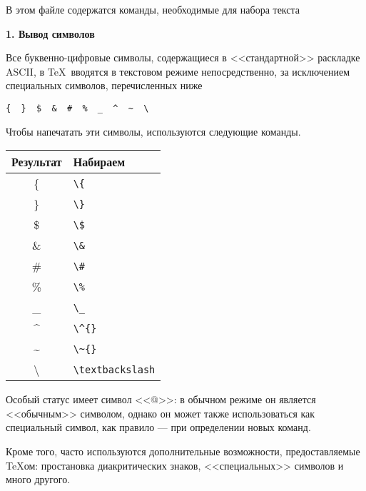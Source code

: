 \documentclass{article}
\begin{document}
\begin{center}
В этом файле содержатся команды, необходимые для набора текста
\end{center}

\textbf{1. Вывод символов}

Все буквенно-цифровые символы, содержащиеся в <<стандартной>> раскладке ASCII, в \TeX\ вводятся в текстовом режиме непосредственно, за исключением специальных символов, перечисленных ниже
\begin{center}
 \verb"{  }  $  &  #  %  _  ^  ~  \"
\end{center}

Чтобы напечатать эти символы, используются следующие команды.

\begin{center}
\begin{tabular}{|c|l|}
\hline
\textbf{Результат} & \textbf{Набираем}     \\ \hline
\{                 & \verb"\{"             \\
\}                 & \verb"\}"             \\
\$                 & \verb"\$"             \\
\&                 & \verb"\&"             \\
\#                 & \verb"\#"             \\
\%                 & \verb"\%"             \\
\_                 & \verb"\_"             \\
\^{}               & \verb"\^{}"           \\
\~{}               & \verb"\~{}"           \\
\textbackslash     & \verb"\textbackslash" \\ \hline
\end{tabular}
\end{center}

Особый статус имеет символ <<@>>: в обычном режиме он является <<обычным>> символом, однако он может также использоваться как специальный символ, как правило --- при определении новых команд.

Кроме того, часто используются дополнительные возможности, предоставляемые \TeX ом: простановка диакритических знаков, <<специальных>> символов и много другого.
\end{document}
